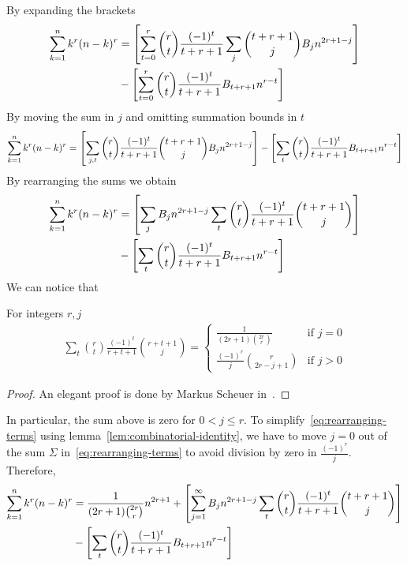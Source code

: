 By expanding the brackets
\begin{align*}
    \sum_{k=1}^{n} k^{r} (n-k)^{r}
    &= \left[ \sum_{t=0}^{r} \binom{r}{t} \frac{(-1)^t}{t+r+1} \sum_{j} \binom{t+r+1}{j} {B}\sb{j} n^{2r+1-j}  \right] \\
    &- \left[ \sum_{t=0}^{r} \binom{r}{t} \frac{(-1)^t}{t+r+1} {B}\sb{t+r+1} n^{r-t} \right]
\end{align*}
By moving the sum in $j$ and omitting summation bounds in $t$
\begin{align*}
    \sum_{k=1}^{n} k^{r} (n-k)^{r}
    = \left[ \sum_{j, t} \binom{r}{t} \frac{(-1)^t}{t+r+1} \binom{t+r+1}{j} {B}\sb{j} n^{2r+1-j}  \right]
    - \left[ \sum_{t} \binom{r}{t} \frac{(-1)^t}{t+r+1} {B}\sb{t+r+1} n^{r-t} \right]
\end{align*}
By rearranging the sums we obtain
\begin{align}
    \label{eq:rearranging-terms}
    \sum_{k=1}^{n} k^{r} (n-k)^{r}
    &= \left[ \sum_{j} {B}\sb{j} n^{2r+1-j} \sum_{t} \binom{r}{t} \frac{(-1)^t}{t+r+1} \binom{t+r+1}{j}  \right] \\
    &- \left[ \sum_{t} \binom{r}{t} \frac{(-1)^t}{t+r+1} {B}\sb{t+r+1} n^{r-t} \right] \nonumber
\end{align}
We can notice that
\begin{lemma}
    \label{lem:combinatorial-identity}
    For integers $r, j$
    \begin{align*}
        \sum_{t} \binom{r}{t} \frac{(-1)^t}{r+t+1} \binom{r+t+1}{j}
        =\begin{cases}
             \frac{1}{(2r+1) \binom{2r}r} & \text{if } j=0\\
             \frac{(-1)^r}{j} \binom{r}{2r-j+1} & \text{if } j>0
        \end{cases}
    \end{align*}
    \begin{proof}
        An elegant proof is done by Markus Scheuer in~\cite{scheuer2023mathstackexchange}.
    \end{proof}
\end{lemma}
In particular, the sum above is zero for $0< j \leq r$.
To simplify~\eqref{eq:rearranging-terms} using lemma~\eqref{lem:combinatorial-identity}, we have to move $j=0$ out of
the sum $\Sigma$
in~\eqref{eq:rearranging-terms} to avoid division by zero in $\frac{(-1)^r}{j}$.
Therefore,
\begin{equation*}
    \begin{split}
        \sum_{k=1}^{n} k^{r} (n-k)^{r}
        &= \frac{1}{(2r+1) \binom{2r}r} n^{2r+1}
        + \left[ \sum_{j = 1}^{\infty} {B}\sb{j} n^{2r+1-j} \sum_{t} \binom{r}{t} \frac{(-1)^t}{t+r+1} \binom{t+r+1}{j} \right] \\
        &- \left[ \sum_{t} \binom{r}{t} \frac{(-1)^t}{t+r+1} {B}\sb{t+r+1} n^{r-t} \right]
    \end{split}
\end{equation*}

